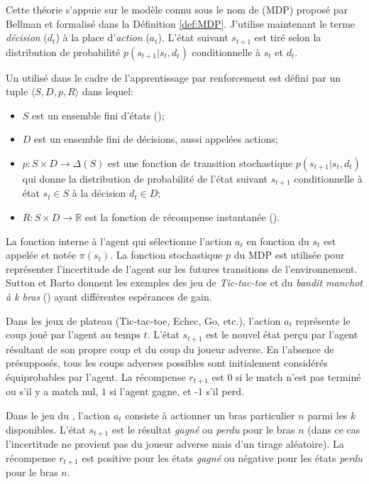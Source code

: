 Cette théorie s'appuie sur le modèle connu sous le nom de  (MDP) proposé par Bellman et formalisé dans la Définition \ref{def:MDP}.
J'utilise maintenant le terme \emph{décision} ($d_t$) à la place d'\emph{action} ($a_t$). 
L'état suivant $s_{t+1}$ est \og tiré \fg selon la distribution de probabilité $p(s_{t+1}|s_t,d_t)$ conditionnelle à $s_t$ et $d_t$.
 
\begin{De}[MDP]
	\label{def:MDP}
	Un  utilisé dans le cadre de l'apprentissage par renforcement est défini par un tuple $\langle S, D, p, R \rangle$ dans lequel:
	\begin{itemize}[label=\scalebox{.85}{$\diamond$}]
		\item $S$ est un ensemble fini d'états ();
		\item $D$ est un ensemble fini de décisions, aussi appelées actions;
		\item $p:S\times D\rightarrow\Delta(S)$ est une fonction de transition stochastique $p(s_{t+1}|s_t,d_t)$ qui donne la distribution de probabilité de l'état suivant $s_{t+1}$ conditionnelle à état $s_t\in S$ à la décision $d_t\in D$;
		\item $R:S\times D\rightarrow \mathbb{R}$ est la fonction de récompense instantanée ().
	\end{itemize}
\end{De}

La fonction interne à l'agent qui sélectionne l'action $a_t$ en fonction du  $s_t$ est appelée  et notée $\pi(s_t)$.
La fonction stochastique $p$ du MDP est utilisée pour représenter l'incertitude de l'agent sur les futures transitions de l'environnement.
Sutton et Barto donnent les exemples des jeu de \emph{Tic-tac-toe} et du \emph{bandit manchot à k bras} () ayant différentes espérances de gain.

Dans les jeux de plateau (Tic-tac-toe, Echec, Go, etc.), l'action $a_t$ représente le coup joué par l'agent au temps $t$. 
L'état $s_{t+1}$ est le nouvel état perçu par l'agent résultant de son propre coup et du coup du joueur adverse.
En l'absence de présupposés, tous les coups adverses possibles sont initialement considérés équiprobables par l'agent. 
La récompense $r_{t+1}$ est 0 si le match n'est pas terminé ou s'il y a match nul, $1$ si l'agent gagne, et -1 s'il perd.  

Dans le jeu du , l'action $a_t$ consiste à actionner un bras particulier $n$ parmi les $k$ disponibles.
L'état $s_{t+1}$ est le résultat \emph{gagné} ou \emph{perdu} pour le bras $n$ (dans ce cas l'incertitude ne provient pas du joueur adverse mais d'un tirage aléatoire). 
La récompense $r_{t+1}$ est positive pour les états \emph{gagné} ou négative pour les états \emph{perdu} pour le bras $n$.  

